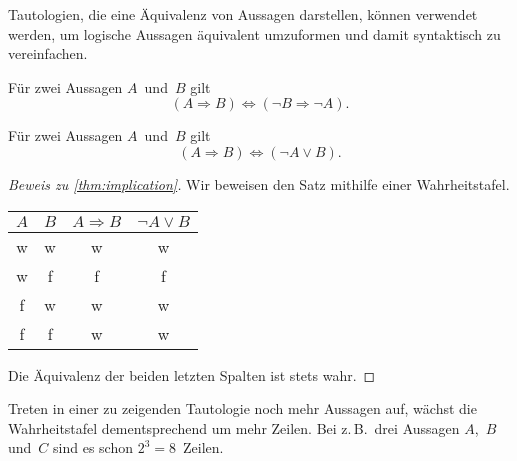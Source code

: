 \documentclass[a4paper]{article}
\begin{document}
Tautologien, die eine Äquivalenz von Aussagen darstellen, können verwendet werden, um logische Aussagen äquivalent umzuformen und damit syntaktisch zu vereinfachen.

\begin{theorem}[Kontraposition]\label{thm:contraposition}
    Für zwei Aussagen $A$~und~$B$ gilt
    \begin{equation*}
        (A \Rightarrow B) \iff (\neg B \Rightarrow \neg A).
    \end{equation*}
\end{theorem}

\begin{theorem}\label{thm:implication}
    Für zwei Aussagen $A$~und~$B$ gilt
    \begin{equation*}
        (A \Rightarrow B) \iff (\neg A \vee B).
    \end{equation*}
\end{theorem}

\begin{proof}[Beweis zu \cref{thm:implication}]
    Wir beweisen den Satz mithilfe einer Wahrheitstafel.
    \begin{center}
        \begin{tabular}{@{}cc@{\colsep}cc@{}}\toprule
            $A$ & $B$ & $A \Rightarrow B$ & $\neg A \vee B$ \\\midrule
            w   & w   & w                 & w               \\
            w   & f   & f                 & f               \\
            f   & w   & w                 & w               \\
            f   & f   & w                 & w               \\\bottomrule
        \end{tabular}
    \end{center}
    Die Äquivalenz der beiden letzten Spalten ist stets wahr.
\end{proof}

Treten in einer zu zeigenden Tautologie noch mehr Aussagen auf, wächst die Wahrheitstafel dementsprechend um mehr Zeilen. Bei z.\,B.\ drei Aussagen $A$,~$B$ und~$C$ sind es schon $2^3 = 8$~Zeilen.
\end{document}

